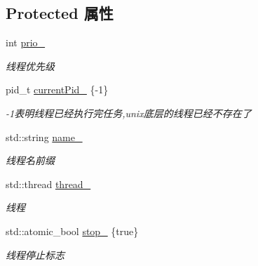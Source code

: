 \subsection*{Protected 属性}
\begin{DoxyCompactItemize}
\item 
\mbox{\label{classThread_ada8c342b34fb001cfcf57619b7150840}} 
int \hyperlink{classThread_ada8c342b34fb001cfcf57619b7150840}{prio\+\_\+}
\begin{DoxyCompactList}\small\item\em 线程优先级 \end{DoxyCompactList}\item 
\mbox{\label{classThread_a0c0878a96696bbb092a69bc2f1f812fd}} 
pid\+\_\+t \hyperlink{classThread_a0c0878a96696bbb092a69bc2f1f812fd}{current\+Pid\+\_\+} \{-\/1\}
\begin{DoxyCompactList}\small\item\em -\/1表明线程已经执行完任务,unix底层的线程已经不存在了 \end{DoxyCompactList}\item 
\mbox{\label{classThread_aa222eb32e5fc8f386d9fb018607acd9c}} 
std\+::string \hyperlink{classThread_aa222eb32e5fc8f386d9fb018607acd9c}{name\+\_\+}
\begin{DoxyCompactList}\small\item\em 线程名前缀 \end{DoxyCompactList}\item 
\mbox{\label{classThread_ad313ba812a7875c743dd0d37d565acfb}} 
std\+::thread \hyperlink{classThread_ad313ba812a7875c743dd0d37d565acfb}{thread\+\_\+}
\begin{DoxyCompactList}\small\item\em 线程 \end{DoxyCompactList}\item 
\mbox{\label{classThread_a091bdad0a084b3f2c659f8cdd5369d53}} 
std\+::atomic\+\_\+bool \hyperlink{classThread_a091bdad0a084b3f2c659f8cdd5369d53}{stop\+\_\+} \{true\}
\begin{DoxyCompactList}\small\item\em 线程停止标志 \end{DoxyCompactList}\item 
\mbox{\label{classThread_a13aa04a60328060dec3a25b286c933a2}} 

\end{DoxyCompactItemize}
